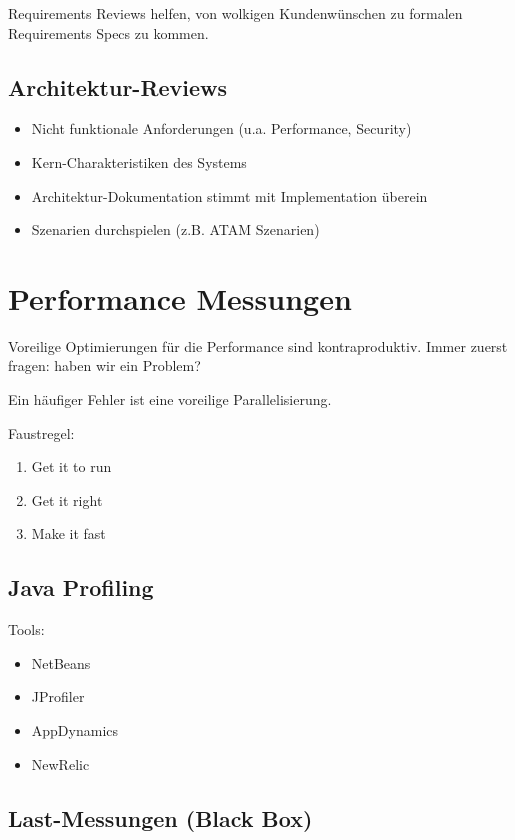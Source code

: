 Requirements Reviews helfen, von wolkigen Kundenwünschen zu formalen Requirements Specs zu kommen.

\subsection{Architektur-Reviews}

\begin{itemize}
	\item Nicht funktionale Anforderungen (u.a. Performance, Security)
	\item Kern-Charakteristiken des Systems
	\item Architektur-Dokumentation stimmt mit Implementation überein
	\item Szenarien durchspielen (z.B. ATAM Szenarien)
\end{itemize}


\section{Performance Messungen}

Voreilige Optimierungen für die Performance sind kontraproduktiv. Immer zuerst fragen: haben wir ein Problem?

Ein häufiger Fehler ist eine voreilige Parallelisierung.

Faustregel:
\begin{enumerate}
	\item Get it to run
	\item Get it right
	\item Make it fast
\end{enumerate}


\subsection{Java Profiling}

Tools:
\begin{itemize}
	\item NetBeans
	\item JProfiler
	\item AppDynamics
	\item NewRelic
\end{itemize}

\subsection{Last-Messungen (Black Box)}

